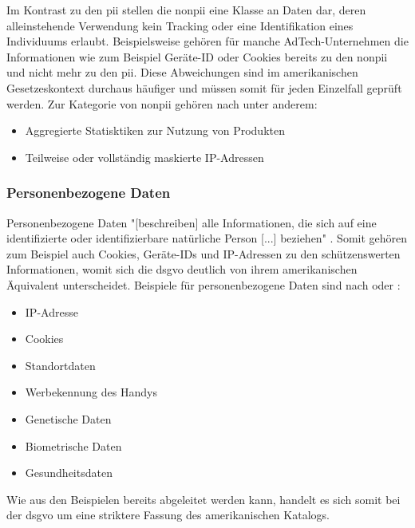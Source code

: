 Im Kontrast zu den \ac{pii} stellen die \ac{nonpii} eine Klasse an Daten dar, deren alleinstehende Verwendung kein Tracking oder eine Identifikation eines Individuums erlaubt. Beispielsweise gehören für manche AdTech-Unternehmen die Informationen wie zum Beispiel Geräte-ID oder Cookies bereits zu den \ac{nonpii} und nicht mehr zu den \ac{pii}. Diese Abweichungen sind im amerikanischen Gesetzeskontext durchaus häufiger und müssen somit für jeden Einzelfall geprüft werden. Zur Kategorie von \ac{nonpii} gehören nach \cite{PiwikPro2022} unter anderem:

\begin{itemize}
	\item Aggregierte Statisktiken zur Nutzung von Produkten
	\item Teilweise oder vollständig maskierte IP-Adressen
\end{itemize}

\subsubsection{Personenbezogene Daten}
\label{sec:Grundlagen:ssec:Klassifikation von Daten:sssec:Personenbezogene Daten}

Personenbezogene Daten "[beschreiben] alle Informationen, die sich auf eine identifizierte oder identifizierbare natürliche Person [...] beziehen" \cite{DSGVOArt4}. Somit gehören zum Beispiel auch Cookies, Geräte-IDs und IP-Adressen zu den schützenswerten Informationen, womit sich die \ac{dsgvo} deutlich von ihrem amerikanischen Äquivalent unterscheidet. Beispiele für personenbezogene Daten sind nach \cite{PiwikPro2022} oder \cite{DSGVOPerDa}:

\begin{itemize}
	\item IP-Adresse
	\item Cookies
	\item Standortdaten
	\item Werbekennung des Handys
	\item Genetische Daten
	\item Biometrische Daten
	\item Gesundheitsdaten
\end{itemize}

Wie aus den Beispielen bereits abgeleitet werden kann, handelt es sich somit bei der \ac{dsgvo} um eine striktere Fassung des amerikanischen Katalogs.

